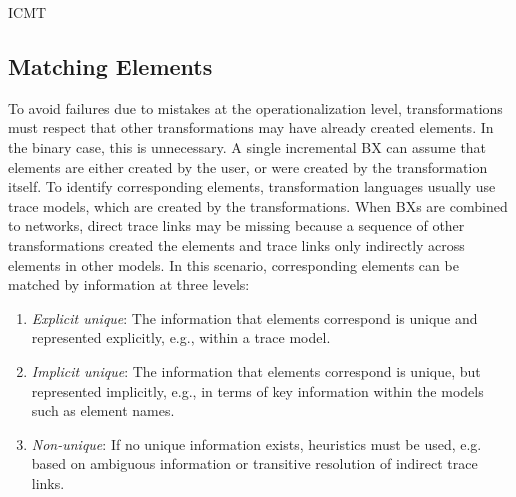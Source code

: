 \begin{copiedFrom}{ICMT}

\subsection{Matching Elements}
\label{chap:prevention:interoperability:matching}

To avoid failures due to mistakes at the operationalization level, transformations must respect that other transformations may have already created elements.
In the binary case, this is unnecessary.
A single incremental \ac{BX} can assume that elements are either created by the user, %
or were created by the transformation itself.
To identify corresponding elements, transformation languages usually use trace models, which are created by the transformations.
When \acp{BX} are combined to networks, %
direct trace links may be missing because a sequence of other transformations created the elements and trace links only indirectly across elements in other models.
In this scenario, corresponding elements can be matched by information at three levels:
\begin{enumerate}
    \item \emph{Explicit unique}: The information that elements correspond is unique and represented explicitly, e.g., within a trace model. %
    \item \emph{Implicit unique}: The information that elements correspond is unique, but represented implicitly, e.g., in terms of key information within the models such as element names. %
    \item \emph{Non-unique}: If no unique information exists, heuristics must be used, e.g. based on ambiguous information or transitive resolution of indirect trace links.
\end{enumerate}


\end{copiedFrom}
